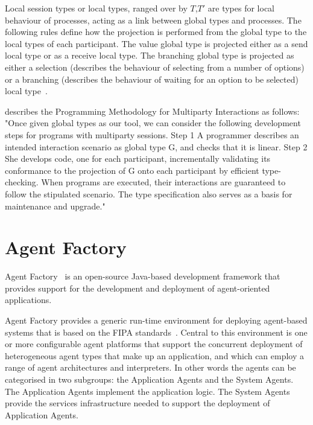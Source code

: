 \documentclass[a4paper,12pt,oneside,fleqn]{book} %
\begin{document}
{%

Local session types or local types, ranged over by $T$,$T'$ are types for
local behaviour of processes, acting as a link between global types and
processes. The following rules define how the projection is performed from the global type to the local types of each participant. The value global type is
projected either as a send local type or as a receive local type. The
branching global type is projected as either a selection (describes the
behaviour of selecting from a number of options) or a branching (describes
the behaviour of waiting for an option to be selected) local type~\cite{DBLP:journals/jacm/HondaYC16}.

\cite{DBLP:journals/jacm/HondaYC16} describes the Programming Methodology
for Multiparty Interactions as follows: "Once given global types as our
tool, we can consider the following development steps for programs with
multiparty sessions.  Step 1 A programmer describes an intended interaction
scenario as global type G, and checks that it is linear.  Step 2 She
develops code, one for each participant, incrementally validating its
conformance to the projection of G onto each participant by efficient
type-checking.  When programs are executed, their interactions are
guaranteed to follow the stipulated scenario. The type specification also
serves as a basis for maintenance and upgrade."

\chapter{Agent Factory} %

Agent Factory~\cite{collier2002agent} \cite{russell2011af} is an
open-source Java-based development framework that provides support for the
development and deployment of agent-oriented applications.

Agent Factory provides a generic run-time environment for deploying
agent-based systems that is based on the FIPA
standards~\cite{poslad2000fipa}.  Central to this environment is one or
more configurable agent platforms that support the concurrent deployment of
heterogeneous agent types that make up an application, and which can employ
a range of agent architectures and interpreters. In other words the agents
can be categorised in two subgroups: the Application Agents and the System
Agents. The Application Agents implement the application logic. The System
Agents provide the services infrastructure needed to support the deployment
of Application Agents.

}
\end{document}
